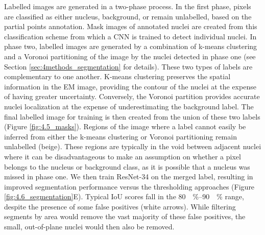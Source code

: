 Labelled images are generated in a two-phase process. In the first phase, pixels are classified as either nucleus, background, or remain unlabelled, based on the partial points annotation. Mask images of annotated nuclei are created from this classification scheme from which a CNN is trained to detect individual nuclei.
In phase two, labelled images are generated by a combination of k-means clustering and a Voronoi partitioning of the image by the nuclei detected in phase one (see Section \ref{sec:4methods_segmentation} for details). These two types of labels are complementary to one another. K-means clustering preserves the spatial information in the EM image, providing the contour of the nuclei at the expense of having greater uncertainty. Conversely, the Voronoi partition provides accurate nuclei localization at the expense of underestimating the background label. The final labelled image for training is then created from the union of these two labels (Figure \ref{fig:4.5_masks}). Regions of the image where a label cannot easily be inferred from either the k-means clustering or Voronoi partitioning remain unlabelled (beige). These regions are typically in the void between adjacent nuclei where it can be disadvantageous to make an assumption on whether a pixel belongs to the nucleus or background class, as it is possible that a nucleus was missed in phase one. We then train ResNet-34 on the merged label, resulting in improved segmentation performance versus the thresholding approaches (Figure \ref{fig:4.6_segmentation}E). Typical IoU scores fall in the \SIrange{80}{90}{\!\percent} range, despite the presence of some false positives (white arrows). While filtering segments by area would remove the vast majority of these false positives, the small, out-of-plane nuclei would then also be removed.

